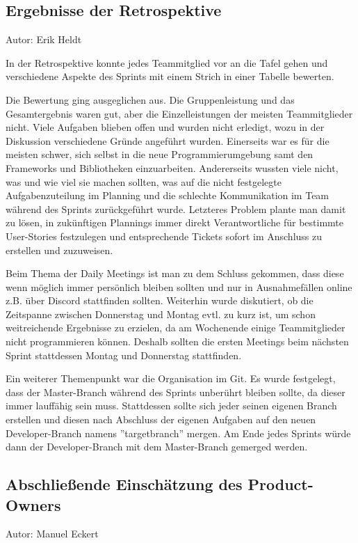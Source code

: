 \subsection{Ergebnisse der Retrospektive}
{\small Autor: Erik Heldt}

In der Retrospektive konnte jedes Teammitglied vor an die Tafel gehen und verschiedene Aspekte des Sprints mit einem Strich in einer Tabelle bewerten.

Die Bewertung ging ausgeglichen aus. Die Gruppenleistung und das Gesamtergebnis waren gut, aber die Einzelleistungen der meisten Teammitglieder nicht. Viele Aufgaben blieben offen und wurden nicht erledigt, wozu in der Diskussion verschiedene Gründe angeführt wurden. Einerseits war es für die meisten schwer, sich selbst in die neue Programmierumgebung samt den Frameworks und Bibliotheken einzuarbeiten. Andererseits wussten viele nicht, was und wie viel sie machen sollten, was auf die nicht festgelegte Aufgabenzuteilung im Planning und die schlechte Kommunikation im Team während des Sprints zurückgeführt wurde. Letzteres Problem plante man damit zu lösen, in zukünftigen Plannings immer direkt Verantwortliche für bestimmte User-Stories festzulegen und entsprechende Tickets sofort im Anschluss zu erstellen und zuzuweisen.

Beim Thema der Daily Meetings ist man zu dem Schluss gekommen, dass diese wenn möglich immer persönlich bleiben sollten und nur in Ausnahmefällen online z.B. über Discord stattfinden sollten. Weiterhin wurde diskutiert, ob die Zeitspanne zwischen Donnerstag und Montag evtl. zu kurz ist, um schon weitreichende Ergebnisse zu erzielen, da am Wochenende einige Teammitglieder nicht programmieren können. Deshalb sollten die ersten Meetings beim nächsten Sprint stattdessen Montag und Donnerstag stattfinden.

Ein weiterer Themenpunkt war die Organisation im Git. Es wurde festgelegt, dass der Master-Branch während des Sprints unberührt bleiben sollte, da dieser immer lauffähig sein muss. Stattdessen sollte sich jeder seinen eigenen Branch erstellen und diesen nach Abschluss der eigenen Aufgaben auf den neuen Developer-Branch namens ''targetbranch'' mergen. Am Ende jedes Sprints würde dann der Developer-Branch mit dem Master-Branch gemerged werden.

\subsection{Abschließende Einschätzung des Product-Owners}
{\small Autor: Manuel Eckert}

